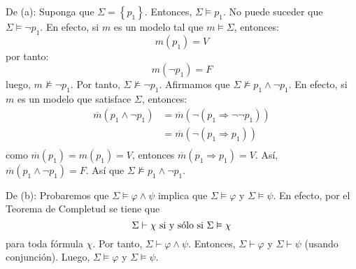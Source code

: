 \documentclass[12pt]{report}
\theoremstyle{largebreak}
\begin{document}
    \begin{sol}
        De (a): Suponga que $\Sigma=\left\{p_1 \right\}$. Entonces, $\Sigma\vDash p_1$. No puede suceder que $\Sigma\vDash\neg p_1$. En efecto, si $m$ es un modelo tal que $m\vDash\Sigma$, entonces:
        \begin{equation*}
            m(p_1)=V
        \end{equation*}
        por tanto:
        \begin{equation*}
            m(\neg p_1)=F
        \end{equation*}
        luego, $m\nvDash\neg p_1$. Por tanto, $\Sigma\nvDash\neg p_1$. Afirmamos que $\Sigma\nvDash p_1\land\neg p_1$. En efecto, si $m$ es un modelo que satisface $\Sigma$, entonces:
        \begin{equation*}
            \begin{split}
                \overline{m}(p_1\land\neg p_1)&=\overline{m}(\neg(p_1\Rightarrow \neg\neg p_1))\\
                &=\overline{m}(\neg(p_1\Rightarrow p_1))\\
            \end{split}
        \end{equation*}
        como $\overline{m}(p_1)=m(p_1)=V$, entonces $\overline{m}(p_1\Rightarrow p_1)=V$. Así, $\overline{m}(p_1\land\neg p_1)=F$. Así que $\Sigma\nvDash p_1\land\neg p_1$.

        De (b): Probaremos que $\Sigma\vDash\varphi\land\psi$ implica que $\Sigma\vDash\varphi$ y $\Sigma\vDash\psi$. En efecto, por el Teorema de Completud se tiene que
        \begin{equation*}
            \Sigma\vdash\chi\textup{ si y sólo si }\Sigma\vDash\chi
        \end{equation*}
        para toda fórmula $\chi$. Por tanto, $\Sigma\vdash\varphi\land\psi$. Entonces, $\Sigma\vdash\varphi$ y $\Sigma\vdash\psi$ (usando conjunción). Luego, $\Sigma\vDash\varphi$ y $\Sigma\vDash\psi$.
    \end{sol}
\end{document}

